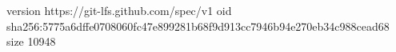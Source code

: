 version https://git-lfs.github.com/spec/v1
oid sha256:5775a6dffe0708060fc47e899281b68f9d913cc7946b94e270eb34c988cead68
size 10948
